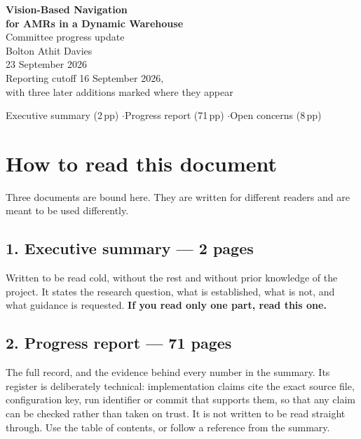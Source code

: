 \documentclass[11pt,a4paper]{article}
\begin{document}
\vspace*{0.22\textheight}
\begin{center}
  {\Huge\bfseries Vision-Based Navigation\\[0.35em] for AMRs in a Dynamic
   Warehouse}\\[2.2em]
  {\LARGE Committee progress update}\\[2.8em]
  {\large Bolton Athit Davies}\\[0.9em]
  {\large 23 September 2026}\\[2.6em]
  {\normalsize Reporting cutoff 16 September 2026,\\[0.3em]
  with three later additions marked where they appear}
\end{center}
\vfill
\begin{center}
  \small
  Executive summary (2\,pp) \quad$\cdot$\quad Progress report (71\,pp)
  \quad$\cdot$\quad Open concerns (8\,pp)
\end{center}
\clearpage

\section*{How to read this document}

Three documents are bound here. They are written for different readers and are
meant to be used differently.

\subsection*{1. Executive summary --- 2 pages}

Written to be read cold, without the rest and without prior knowledge of the
project. It states the research question, what is established, what is not, and
what guidance is requested. \textbf{If you read only one part, read this one.}

\subsection*{2. Progress report --- 71 pages}

The full record, and the evidence behind every number in the summary. Its
register is deliberately technical: implementation claims cite the exact source
file, configuration key, run identifier or commit that supports them, so that any
claim can be checked rather than taken on trust. It is not written to be read
straight through. Use the table of contents, or follow a reference from the
summary.
\end{document}
